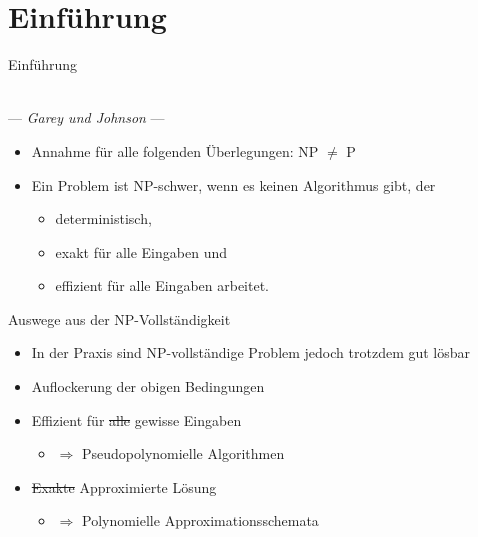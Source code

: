 \section{Einführung}

\begin{frame}{Einführung}
	\begin{minipage}[t][0.25\textheight]{1\textwidth}
		\centering
		 \\ --- \textit{Garey und Johnson} ---
	\end{minipage}
	\pause
	\begin{minipage}[t][0.5\textheight]{1\textwidth}
	\begin{itemize}
		\item Annahme für alle folgenden Überlegungen: NP $\neq$ P
		\item Ein Problem ist NP-schwer, wenn es keinen Algorithmus gibt, der
			\begin{itemize}
				\item	deterministisch,
				\item exakt für alle Eingaben und 
				\item	effizient für alle Eingaben arbeitet.
			\end{itemize}
		\end{itemize}
	\end{minipage}
\end{frame}

\begin{frame}{Auswege aus der NP-Vollständigkeit}
\begin{itemize}
	\item In der Praxis sind NP-vollständige Problem jedoch trotzdem gut lösbar
	\item Auflockerung der obigen Bedingungen
	\item Effizient für \st{alle} gewisse Eingaben 
	\begin{itemize}
		\item[] $\Rightarrow$ Pseudopolynomielle Algorithmen
	\end{itemize}
	\item \st{Exakte} Approximierte Lösung
	\begin{itemize}
		\item[] $\Rightarrow$ Polynomielle Approximationsschemata
	\end{itemize}
\end{itemize}
\end{frame}

